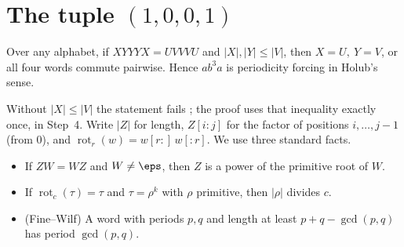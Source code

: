 \section{The tuple \((1,0,0,1)\)}
\begin{theorem}\label{t1001}
Over any alphabet, if \(XYYYX=UVVVU\) and \(|X|,|Y|\le|V|\), then \(X=U,\ Y=V\), or all four words commute pairwise. Hence \(ab^3a\) is periodicity forcing in Holub's sense.
\end{theorem}
Without \(|X|\le|V|\) the statement fails \cite{hh}; the proof uses that inequality exactly once, in Step~4. Write \(|Z|\) for length, \(Z[i{:}j]\) for the factor of positions \(i,\dots,j-1\) (from \(0\)), and \(\operatorname{rot}_r(w)=w[r{:}]\,w[{:}r]\). We use three standard facts.
\begin{itemize}
\item[(F1)] If \(ZW=WZ\) and \(W\ne\eps\), then \(Z\) is a power of the primitive root of \(W\).
\item[(F2)] If \(\operatorname{rot}_c(\tau)=\tau\) and \(\tau=\rho^k\) with \(\rho\) primitive, then \(|\rho|\) divides \(c\).
\item[(F3)] (Fine--Wilf) A word with periods \(p,q\) and length at least \(p+q-\gcd(p,q)\) has period \(\gcd(p,q)\).
\end{itemize}

